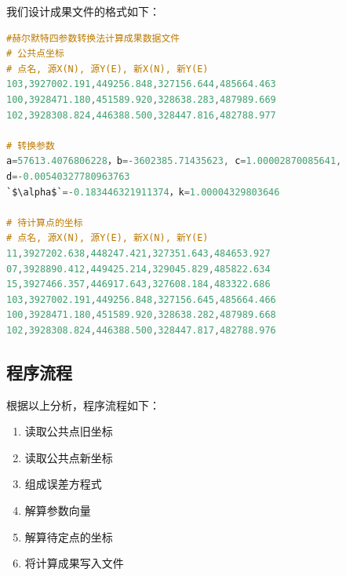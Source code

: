 我们设计成果文件的格式如下：

\begin{lstlisting}[language=C]
#赫尔默特四参数转换法计算成果数据文件
# 公共点坐标
# 点名, 源X(N), 源Y(E), 新X(N), 新Y(E)
103,3927002.191,449256.848,327156.644,485664.463
100,3928471.180,451589.920,328638.283,487989.669
102,3928308.824,446388.500,328447.816,482788.977

# 转换参数
a=57613.4076806228，b=-3602385.71435623, c=1.00002870085641,
d=-0.00540327780963763
`$\alpha$`=-0.183446321911374，k=1.00004329803646

# 待计算点的坐标
# 点名, 源X(N), 源Y(E), 新X(N), 新Y(E)
11,3927202.638,448247.421,327351.643,484653.927
07,3928890.412,449425.214,329045.829,485822.634
15,3927466.357,446917.643,327608.184,483322.686
103,3927002.191,449256.848,327156.645,485664.466
100,3928471.180,451589.920,328638.282,487989.668
102,3928308.824,446388.500,328447.817,482788.976
\end{lstlisting}

\subsection{程序流程}
根据以上分析，程序流程如下：
\begin{enumerate}
  \item 读取公共点旧坐标
  \item 读取公共点新坐标
  \item 组成误差方程式
  \item 解算参数向量
  \item 解算待定点的坐标
  \item 将计算成果写入文件
\end{enumerate}


